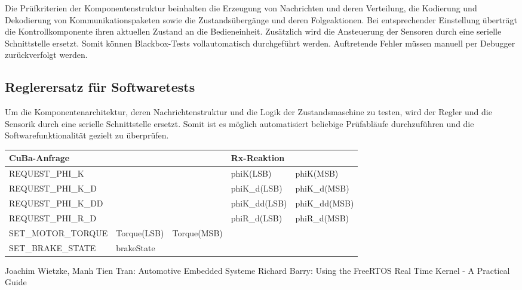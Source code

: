 \documentclass{article}
\begin{document}
Die Prüfkriterien der Komponentenstruktur beinhalten die Erzeugung von Nachrichten und deren Verteilung, die Kodierung und Dekodierung von Kommunikationspaketen sowie die Zustandsübergänge und deren Folgeaktionen. Bei entsprechender Einstellung überträgt die Kontrollkomponente ihren aktuellen Zustand an die Bedieneinheit. Zusätzlich wird die Ansteuerung der Sensoren durch eine serielle Schnittstelle ersetzt. Somit können Blackbox-Tests vollautomatisch durchgeführt werden. Auftretende Fehler müssen manuell per Debugger zurückverfolgt werden.


\subsection*{Reglerersatz für Softwaretests}
Um die Komponentenarchitektur, deren Nachrichtenstruktur und die Logik der Zustandsmaschine zu testen, wird der Regler und die Sensorik durch eine serielle Schnittstelle ersetzt. Somit ist es möglich automatisiert beliebige Prüfabläufe durchzuführen und die Softwarefunktionalität gezielt zu überprüfen.

\begin{table}[h]
\centering
\label{my-label}
\begin{tabular}{|l|l|l|l|l|}
\hline
\textbf{CuBa-Anfrage} & \textbf{}   & \textbf{}   & \textbf{Rx-Reaktion} &               \\ \hline
REQUEST\_PHI\_K       &             &             & phiK(LSB)            & phiK(MSB)     \\ \hline
REQUEST\_PHI\_K\_D    &             &             & phiK\_d(LSB)         & phiK\_d(MSB)  \\ \hline
REQUEST\_PHI\_K\_DD   &             &             & phiK\_dd(LSB)        & phiK\_dd(MSB) \\ \hline
REQUEST\_PHI\_R\_D    &             &             & phiR\_d(LSB)         &  phiR\_d(MSB) \\ \hline
SET\_MOTOR\_TORQUE    & Torque(LSB) & Torque(MSB) &                      &               \\ \hline
SET\_BRAKE\_STATE     & brakeState  &             &                      &               \\ \hline
\end{tabular}
\end{table}

\newpage
\begin{thebibliography}{\hspace{0.5cm}}
	 Joachim Wietzke, Manh Tien Tran: Automotive Embedded Systeme
	 Richard Barry: Using the FreeRTOS Real Time Kernel - A Practical Guide
\end{thebibliography}
\end{document}
